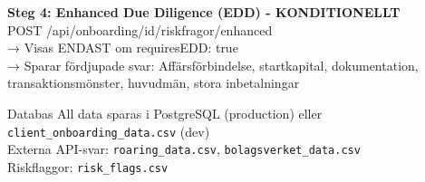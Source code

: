 \documentclass[10pt]{beamer}
\begin{document}
\begin{frame}[label=riskfragor-api]
  \vspace{0.3cm}

  \textbf{Steg 4: Enhanced Due Diligence (EDD) - KONDITIONELLT}\\
  \tiny POST /api/onboarding/{id}/riskfragor/enhanced\\
  \tiny → Visas ENDAST om requiresEDD: true\\
  \tiny → Sparar fördjupade svar: Affärsförbindelse, startkapital, dokumentation, transaktionsmönster, huvudmän, stora inbetalningar

  \vspace{0.3cm}

  \begin{alertblock}{Databas}
    \tiny All data sparas i PostgreSQL (production) eller \texttt{client\_onboarding\_data.csv} (dev)\\
    Externa API-svar: \texttt{roaring\_data.csv}, \texttt{bolagsverket\_data.csv}\\
    Riskflaggor: \texttt{risk\_flags.csv}
  \end{alertblock}
\end{frame}
\end{document}
